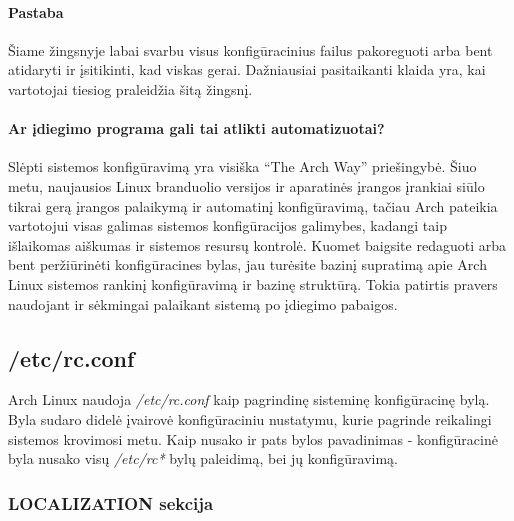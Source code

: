 \paragraph{Pastaba} Šiame žingsnyje labai svarbu visus konfigūracinius
failus pakoreguoti arba bent atidaryti ir įsitikinti, kad viskas
gerai. Dažniausiai pasitaikanti klaida yra, kai vartotojai tiesiog
praleidžia šitą žingsnį.

\paragraph{Ar įdiegimo programa gali tai atlikti automatizuotai?}

Slėpti sistemos konfigūravimą yra visiška ``The Arch Way''
priešingybė. Šiuo metu, naujausios Linux branduolio versijos ir
aparatinės įrangos įrankiai siūlo tikrai gerą įrangos palaikymą ir
automatinį konfigūravimą, tačiau Arch pateikia vartotojui visas galimas
sistemos konfigūracijos galimybes, kadangi taip išlaikomas aiškumas ir
sistemos resursų kontrolė. Kuomet baigsite redaguoti arba bent
peržiūrinėti konfigūracines bylas, jau turėsite bazinį supratimą apie
Arch Linux sistemos rankinį konfigūravimą ir bazinę struktūrą. Tokia
patirtis pravers naudojant ir sėkmingai palaikant sistemą po įdiegimo
pabaigos.

\subsection{/etc/rc.conf}

Arch Linux naudoja \textsl{/etc/rc.conf} kaip pagrindinę sisteminę
konfigūracinę bylą. Byla sudaro didelė įvairovė konfigūraciniu
nustatymu, kurie pagrinde reikalingi sistemos krovimosi metu. Kaip
nusako ir pats bylos pavadinimas - konfigūracinė byla nusako visų
\textsl{/etc/rc*} bylų paleidimą, bei jų konfigūravimą. 

\subsubsection{LOCALIZATION sekcija}

